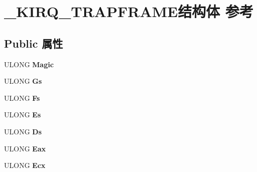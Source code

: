 \hypertarget{struct___k_i_r_q___t_r_a_p_f_r_a_m_e}{}\section{\+\_\+\+K\+I\+R\+Q\+\_\+\+T\+R\+A\+P\+F\+R\+A\+M\+E结构体 参考}
\label{struct___k_i_r_q___t_r_a_p_f_r_a_m_e}
\subsection*{Public 属性}
\begin{DoxyCompactItemize}
\item 
\mbox{\label{struct___k_i_r_q___t_r_a_p_f_r_a_m_e_acec008ff0e495d2e4db2b989820b4bfc}} 
U\+L\+O\+NG {\bfseries Magic}
\item 
\mbox{\label{struct___k_i_r_q___t_r_a_p_f_r_a_m_e_ad7d67d427bb9920943ca35f55f8bfbbf}} 
U\+L\+O\+NG {\bfseries Gs}
\item 
\mbox{\label{struct___k_i_r_q___t_r_a_p_f_r_a_m_e_a3c9165ecf6a2404d833c09867bc7b68a}} 
U\+L\+O\+NG {\bfseries Fs}
\item 
\mbox{\label{struct___k_i_r_q___t_r_a_p_f_r_a_m_e_a34bcb5b22f33f0a1980f1cb95e968c89}} 
U\+L\+O\+NG {\bfseries Es}
\item 
\mbox{\label{struct___k_i_r_q___t_r_a_p_f_r_a_m_e_a39d5232acfe0e9851d14f5218a3c9d1d}} 
U\+L\+O\+NG {\bfseries Ds}
\item 
\mbox{\label{struct___k_i_r_q___t_r_a_p_f_r_a_m_e_a93b55283b80a7f733c97020da3a3e6b5}} 
U\+L\+O\+NG {\bfseries Eax}
\item 
\mbox{\label{struct___k_i_r_q___t_r_a_p_f_r_a_m_e_a66851fe01026fac92c0e70fcaa0af591}} 
U\+L\+O\+NG {\bfseries Ecx}
\item 
\mbox{\label{struct___k_i_r_q___t_r_a_p_f_r_a_m_e_aebe742c3e737bd706f043019cb4f6f3c}} 

\end{DoxyCompactItemize}
